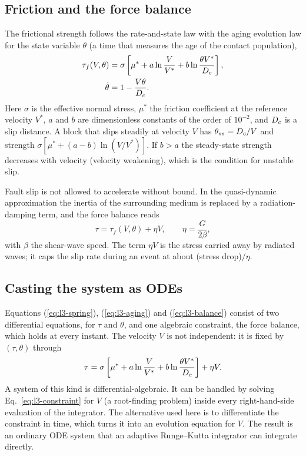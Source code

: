 \subsection{Friction and the force balance}

The frictional strength follows the rate-and-state law with the aging evolution law for the state variable $\theta$ (a time that measures the age of the contact population),
\begin{align}
\tau_f(V,\theta) &= \sigma\left[\mu^* + a\ln\frac{V}{V^*} + b\ln\frac{\theta V^*}{D_c}\right],
\label{eq:l3-rsf}\\
\dot\theta &= 1 - \frac{V\theta}{D_c}.
\label{eq:l3-aging}
\end{align}
Here $\sigma$ is the effective normal stress, $\mu^*$ the friction coefficient at the reference velocity $V^*$, $a$ and $b$ are dimensionless constants of the order of $10^{-2}$, and $D_c$ is a slip distance. A block that slips steadily at velocity $V$ has $\theta_{ss}=D_c/V$ and strength $\sigma[\mu^*+(a-b)\ln(V/V^*)]$. If $b>a$ the steady-state strength decreases with velocity (velocity weakening), which is the condition for unstable slip.

Fault slip is not allowed to accelerate without bound. In the quasi-dynamic approximation the inertia of the surrounding medium is replaced by a radiation-damping term, and the force balance reads
\begin{equation}
\tau = \tau_f(V,\theta) + \eta V,\qquad \eta = \frac{G}{2\beta},
\label{eq:l3-balance}
\end{equation}
with $\beta$ the shear-wave speed. The term $\eta V$ is the stress carried away by radiated waves; it caps the slip rate during an event at about (stress drop)$/\eta$.

\subsection{Casting the system as ODEs}

Equations (\ref{eq:l3-spring}), (\ref{eq:l3-aging}) and (\ref{eq:l3-balance}) consist of two differential equations, for $\tau$ and $\theta$, and one algebraic constraint, the force balance, which holds at every instant. The velocity $V$ is not independent: it is fixed by $(\tau,\theta)$ through
\begin{equation}
\tau = \sigma\left[\mu^*+a\ln\frac{V}{V^*}+b\ln\frac{\theta V^*}{D_c}\right]+\eta V.
\label{eq:l3-constraint}
\end{equation}
A system of this kind is differential-algebraic. It can be handled by solving Eq.~\eqref{eq:l3-constraint} for $V$ (a root-finding problem) inside every right-hand-side evaluation of the integrator. The alternative used here is to differentiate the constraint in time, which turns it into an evolution equation for $V$. The result is an ordinary ODE system that an adaptive Runge--Kutta integrator can integrate directly.

